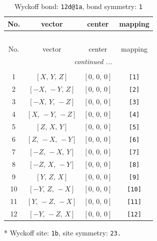 \documentclass[fleqn,8pt]{jsarticle}
\begin{document}
\begin{longtable}{cccc}
\caption{Wyckoff bond: {\tt 12d@1a}, bond symmetry: {\tt 1}}
 \\
 \hline \hline
No. & vector & center & mapping \\ \hline \endfirsthead

\multicolumn{3}{l}{\tablename\ \thetable{}} \\
 \hline \hline
No. & vector & center & mapping \\ \hline \endhead

 \hline \hline
\multicolumn{3}{r}{\footnotesize\it continued ...} \\ \endfoot

 \hline \hline
\multicolumn{3}{r}{} \\ \endlastfoot

1 & $\left[ X,\, Y,\, Z \right]$ & $\left[ 0,\, 0,\, 0 \right]$ & {\tt [1]} \\ \hline
2 & $\left[ - X,\, - Y,\, Z \right]$ & $\left[ 0,\, 0,\, 0 \right]$ & {\tt [2]} \\ \hline
3 & $\left[ - X,\, Y,\, - Z \right]$ & $\left[ 0,\, 0,\, 0 \right]$ & {\tt [3]} \\ \hline
4 & $\left[ X,\, - Y,\, - Z \right]$ & $\left[ 0,\, 0,\, 0 \right]$ & {\tt [4]} \\ \hline
5 & $\left[ Z,\, X,\, Y \right]$ & $\left[ 0,\, 0,\, 0 \right]$ & {\tt [5]} \\ \hline
6 & $\left[ Z,\, - X,\, - Y \right]$ & $\left[ 0,\, 0,\, 0 \right]$ & {\tt [6]} \\ \hline
7 & $\left[ - Z,\, - X,\, Y \right]$ & $\left[ 0,\, 0,\, 0 \right]$ & {\tt [7]} \\ \hline
8 & $\left[ - Z,\, X,\, - Y \right]$ & $\left[ 0,\, 0,\, 0 \right]$ & {\tt [8]} \\ \hline
9 & $\left[ Y,\, Z,\, X \right]$ & $\left[ 0,\, 0,\, 0 \right]$ & {\tt [9]} \\ \hline
10 & $\left[ - Y,\, Z,\, - X \right]$ & $\left[ 0,\, 0,\, 0 \right]$ & {\tt [10]} \\ \hline
11 & $\left[ Y,\, - Z,\, - X \right]$ & $\left[ 0,\, 0,\, 0 \right]$ & {\tt [11]} \\ \hline
12 & $\left[ - Y,\, - Z,\, X \right]$ & $\left[ 0,\, 0,\, 0 \right]$ & {\tt [12]} \\
\end{longtable}
* Wyckoff site: {\tt 1b}, site symmetry: {\tt 23.}
\renewcommand{\arraystretch}{1.2}
\end{document}

